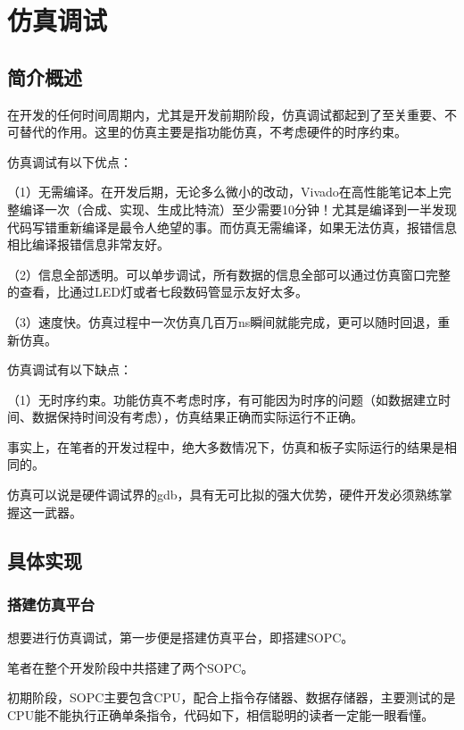 \chapter{仿真调试}

\section{简介概述}

在开发的任何时间周期内，尤其是开发前期阶段，仿真调试都起到了至关重要、不可替代的作用。这里的仿真主要是指功能仿真，不考虑硬件的时序约束。

仿真调试有以下优点：

（1）无需编译。在开发后期，无论多么微小的改动，Vivado在高性能笔记本上完整编译一次（合成、实现、生成比特流）至少需要10分钟！尤其是编译到一半发现代码写错重新编译是最令人绝望的事。而仿真无需编译，如果无法仿真，报错信息相比编译报错信息非常友好。

（2）信息全部透明。可以单步调试，所有数据的信息全部可以通过仿真窗口完整的查看，比通过LED灯或者七段数码管显示友好太多。

（3）速度快。仿真过程中一次仿真几百万ns瞬间就能完成，更可以随时回退，重新仿真。

仿真调试有以下缺点：

（1）无时序约束。功能仿真不考虑时序，有可能因为时序的问题（如数据建立时间、数据保持时间没有考虑），仿真结果正确而实际运行不正确。

事实上，在笔者的开发过程中，绝大多数情况下，仿真和板子实际运行的结果是相同的。

仿真可以说是硬件调试界的gdb，具有无可比拟的强大优势，硬件开发必须熟练掌握这一武器。

\section{具体实现}

\subsection{搭建仿真平台}

想要进行仿真调试，第一步便是搭建仿真平台，即搭建SOPC。

笔者在整个开发阶段中共搭建了两个SOPC。

初期阶段，SOPC主要包含CPU，配合上指令存储器、数据存储器，主要测试的是CPU能不能执行正确单条指令，代码如下，相信聪明的读者一定能一眼看懂。

